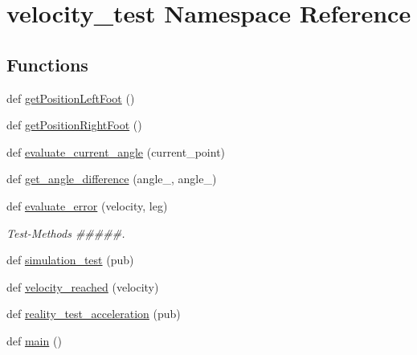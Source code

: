 \hypertarget{namespacevelocity__test}{}\section{velocity\+\_\+test Namespace Reference}
\label{namespacevelocity__test}
\subsection*{Functions}
\begin{DoxyCompactItemize}
\item 
def \mbox{\hyperlink{namespacevelocity__test_a09c5161f2629ebf00339d12e3fe96d69}{get\+Position\+Left\+Foot}} ()
\item 
def \mbox{\hyperlink{namespacevelocity__test_a955421a976ceed10e8856c31a39801cd}{get\+Position\+Right\+Foot}} ()
\item 
def \mbox{\hyperlink{namespacevelocity__test_a5f76d6bc3a4b720b080228a4c4576725}{evaluate\+\_\+current\+\_\+angle}} (current\+\_\+point)
\item 
def \mbox{\hyperlink{namespacevelocity__test_a3b7c195a552b65290f4344865f48948e}{get\+\_\+angle\+\_\+difference}} (angle\+\_, angle\+\_)
\item 
def \mbox{\hyperlink{namespacevelocity__test_a39ca1f32ae8d0b7035cb207c50722da0}{evaluate\+\_\+error}} (velocity, leg)
\begin{DoxyCompactList}\small\item\em Test-\/\+Methods \#\#\#\#\#. \end{DoxyCompactList}\item 
def \mbox{\hyperlink{namespacevelocity__test_a3abe39643659ed5bf979398a5b0cec6d}{simulation\+\_\+test}} (pub)
\item 
def \mbox{\hyperlink{namespacevelocity__test_a125db86a88728cf91ab4383613e22cd1}{velocity\+\_\+reached}} (velocity)
\item 
def \mbox{\hyperlink{namespacevelocity__test_a5a1df3045e7c48f88802aed31b0f67af}{reality\+\_\+test\+\_\+acceleration}} (pub)
\item 
def \mbox{\hyperlink{namespacevelocity__test_a8f407ca9d9142c949c0b88908466df6c}{main}} ()
\end{DoxyCompactItemize}
